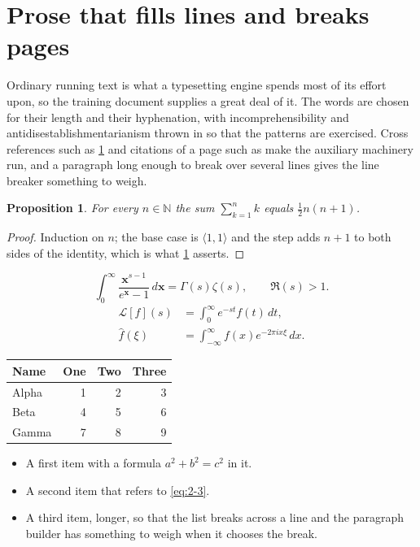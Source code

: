 \documentclass[11pt,a4paper]{report}
\theoremstyle{plain}
\newtheorem{proposition}{Proposition}[chapter]
\newcommand{\vecn}[1]{\mathbf{#1}}
\newcommand{\pairs}[2]{\langle #1,#2\rangle}
\begin{document}
\section{Prose that fills lines and breaks pages}
\label{sec:prose2-3}
Ordinary running text is what a typesetting engine spends most of its effort
upon, so the training document supplies a great deal of it. The words are
chosen for their length and their hyphenation, with incomprehensibility and
antidisestablishmentarianism thrown in so that the patterns are exercised.
Cross references such as \cref{sec:prose2-3} and citations of a page such
as \pageref{sec:prose2-3} make the auxiliary machinery run, and a
paragraph long enough to break over several lines gives the line breaker
something to weigh.
\begin{proposition}\label{prop:2-3}
For every $n\in\mathbb{N}$ the sum $\sum_{k=1}^{n}k$ equals
$\tfrac{1}{2}n(n+1)$.
\end{proposition}
\begin{proof}
Induction on $n$; the base case is $\pairs{1}{1}$ and the step adds $n+1$ to
both sides of the identity, which is what \cref{prop:2-3} asserts.
\end{proof}
\begin{equation}\label{eq:2-3}
  \int_{0}^{\infty}\frac{\vecn{x}^{s-1}}{e^{\vecn{x}}-1}\,d\vecn{x}
    = \Gamma(s)\zeta(s),\qquad \Re(s)>1 .
\end{equation}
\begin{align}
  \mathcal{L}[f](s) &= \int_{0}^{\infty} e^{-st} f(t)\,dt, \\
  \widehat{f}(\xi)  &= \int_{-\infty}^{\infty} f(x) e^{-2\pi i x\xi}\,dx .
\end{align}
\par\noindent\begin{center}
\begin{tabular}{lrrr}
\hline
Name & One & Two & Three \\
\hline
Alpha & 1 & 2 & 3 \\
Beta & 4 & 5 & 6 \\
Gamma & 7 & 8 & 9 \\
\hline
\end{tabular}
\end{center}
\begin{itemize}
  \item A first item with a formula $a^2+b^2=c^2$ in it.
  \item A second item that refers to \eqref{eq:2-3}.
  \item A third item, longer, so that the list breaks across a line and the
    paragraph builder has something to weigh when it chooses the break.
\end{itemize}
\end{document}
